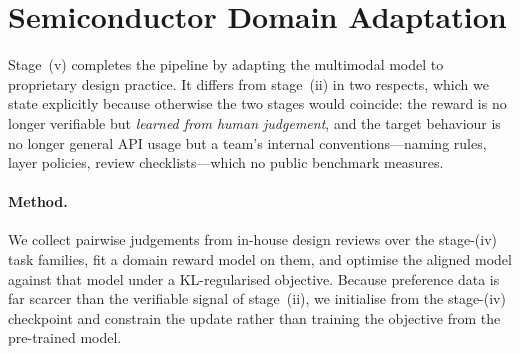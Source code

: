 \section{Semiconductor Domain Adaptation}\label{sec:domain}

Stage~(v) completes the pipeline by adapting the multimodal model to proprietary design practice.
It differs from stage~(ii) in two respects, which we state explicitly because otherwise the two stages would coincide: the reward is no longer verifiable but \emph{learned from human judgement}, and the target behaviour is no longer general API usage but a team's internal conventions---naming rules, layer policies, review checklists---which no public benchmark measures.

\paragraph{Method.}
We collect pairwise judgements from in-house design reviews over the stage-(iv) task families, fit a domain reward model on them, and optimise the aligned model against that model under a KL-regularised objective.
Because preference data is far scarcer than the verifiable signal of stage~(ii), we initialise from the stage-(iv) checkpoint and constrain the update rather than training the objective from the pre-trained model.

